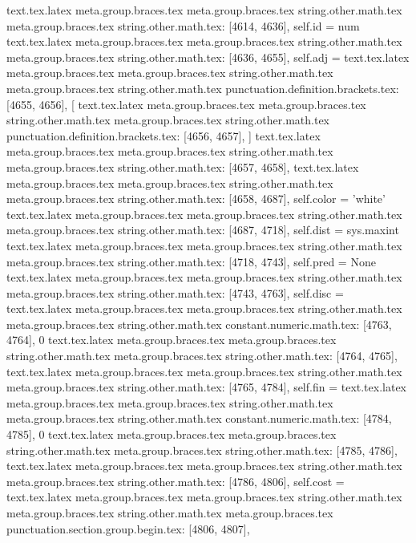 {{{{{{{{{{{{{{{{{{{{{{{{{{{{{{{{{{{{{{{{{{{{{{{{{{{{{{{{{{{{{{{{{{{{{{{{{{{{{{{{{{{{{{{{{{{{{{{{{{{{{{{{{{{{{{{{{{{{{{{{{{{{{{{{{{{{{{{{{{{{{{{{{}
text.tex.latex meta.group.braces.tex meta.group.braces.tex string.other.math.tex meta.group.braces.tex string.other.math.tex: [4614, 4636], {        self.id = num
}
text.tex.latex meta.group.braces.tex meta.group.braces.tex string.other.math.tex meta.group.braces.tex string.other.math.tex: [4636, 4655], {        self.adj = }
text.tex.latex meta.group.braces.tex meta.group.braces.tex string.other.math.tex meta.group.braces.tex string.other.math.tex punctuation.definition.brackets.tex: [4655, 4656], {[}
text.tex.latex meta.group.braces.tex meta.group.braces.tex string.other.math.tex meta.group.braces.tex string.other.math.tex punctuation.definition.brackets.tex: [4656, 4657], {]}
text.tex.latex meta.group.braces.tex meta.group.braces.tex string.other.math.tex meta.group.braces.tex string.other.math.tex: [4657, 4658], {
}
text.tex.latex meta.group.braces.tex meta.group.braces.tex string.other.math.tex meta.group.braces.tex string.other.math.tex: [4658, 4687], {        self.color = 'white'
}
text.tex.latex meta.group.braces.tex meta.group.braces.tex string.other.math.tex meta.group.braces.tex string.other.math.tex: [4687, 4718], {        self.dist = sys.maxint
}
text.tex.latex meta.group.braces.tex meta.group.braces.tex string.other.math.tex meta.group.braces.tex string.other.math.tex: [4718, 4743], {        self.pred = None
}
text.tex.latex meta.group.braces.tex meta.group.braces.tex string.other.math.tex meta.group.braces.tex string.other.math.tex: [4743, 4763], {        self.disc = }
text.tex.latex meta.group.braces.tex meta.group.braces.tex string.other.math.tex meta.group.braces.tex string.other.math.tex constant.numeric.math.tex: [4763, 4764], {0}
text.tex.latex meta.group.braces.tex meta.group.braces.tex string.other.math.tex meta.group.braces.tex string.other.math.tex: [4764, 4765], {
}
text.tex.latex meta.group.braces.tex meta.group.braces.tex string.other.math.tex meta.group.braces.tex string.other.math.tex: [4765, 4784], {        self.fin = }
text.tex.latex meta.group.braces.tex meta.group.braces.tex string.other.math.tex meta.group.braces.tex string.other.math.tex constant.numeric.math.tex: [4784, 4785], {0}
text.tex.latex meta.group.braces.tex meta.group.braces.tex string.other.math.tex meta.group.braces.tex string.other.math.tex: [4785, 4786], {
}
text.tex.latex meta.group.braces.tex meta.group.braces.tex string.other.math.tex meta.group.braces.tex string.other.math.tex: [4786, 4806], {        self.cost = }
text.tex.latex meta.group.braces.tex meta.group.braces.tex string.other.math.tex meta.group.braces.tex string.other.math.tex meta.group.braces.tex punctuation.section.group.begin.tex: [4806, 4807], {{}
}}}}}}}}}}}}}}}}}}}}}}}}}}}}}}}}}}}}}}}}}}}}}}}}}}}}}}}}}}}}}}}}}}}}}}}}}}}}}}}}}}}}}}}}}}}}}}}}}}}}}}}}}}}}}}}}}}}}}}}}}}}}}}}}}}}}}}}}}}}}}}}}}
